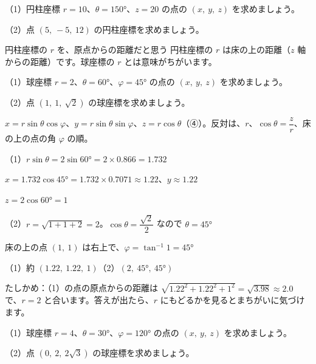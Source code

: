 \begin{jibun}
（1）円柱座標 $r=10$、$\theta=150°$、$z=20$ の点の $(x,\ y,\ z)$ を求めましょう。\par
（2）点 $(5,\ -5,\ 12)$ の円柱座標を求めましょう。
\end{jibun}

\begin{tsumazuki}{円柱座標の $r$ を、原点からの距離だと思う}
円柱座標の $r$ は床の上の距離（$z$ 軸からの距離）です。球座標の $r$ とは意味がちがいます。
\end{tsumazuki}

\begin{reidai}[球座標]
（1）球座標 $r=2$、$\theta=60°$、$\varphi=45°$ の点の $(x,\ y,\ z)$ を求めましょう。\par
（2）点 $(1,\ 1,\ \sqrt2)$ の球座標を求めましょう。\par
\kangaekata $x=r\sin\theta\cos\varphi$、$y=r\sin\theta\sin\varphi$、$z=r\cos\theta$（④）。反対は、$r$、$\cos\theta=\dfrac{z}{r}$、床の上の点の角 $\varphi$ の順。\par
\shiki（1）$r\sin\theta=2\sin60°=2\times0.866=1.732$\par
\hspace*{4.6\zw}$x=1.732\cos45°=1.732\times0.7071\approx1.22$、\enspace $y\approx1.22$\par
\hspace*{4.6\zw}$z=2\cos60°=1$\par
\hspace*{2.6\zw}（2）$r=\sqrt{1+1+2}=2$。\enspace $\cos\theta=\dfrac{\sqrt2}{2}$ なので $\theta=45°$\par
\hspace*{4.6\zw}床の上の点 $(1,\ 1)$ は右上で、$\varphi=\tan^{-1}1=45°$\par
\kotae （1）約 $(1.22,\ 1.22,\ 1)$\quad（2）$(2,\ 45°,\ 45°)$
\end{reidai}
たしかめ：（1）の点の原点からの距離は $\sqrt{1.22^2+1.22^2+1^2}=\sqrt{3.98}\approx2.0$ で、$r=2$ と合います。答えが出たら、$r$ にもどるかを見るとまちがいに気づけます。

\begin{jibun}
（1）球座標 $r=4$、$\theta=30°$、$\varphi=120°$ の点の $(x,\ y,\ z)$ を求めましょう。\par
（2）点 $(0,\ 2,\ 2\sqrt3)$ の球座標を求めましょう。
\end{jibun}

